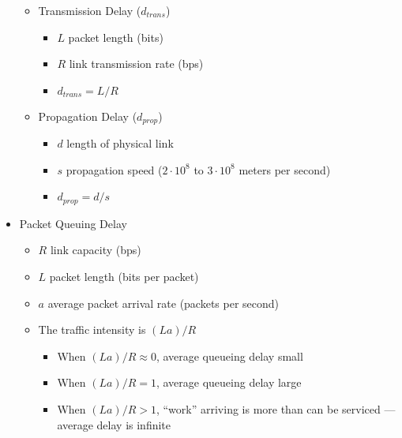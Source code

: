\begin{itemize}
\begin{itemize}
\begin{itemize}
        \end{itemize}

      \item Transmission Delay ($d_{trans}$)

        \begin{itemize}

          \item $L$ packet length (bits)

          \item $R$ link transmission rate (bps)

          \item $d_{trans}=L/R$

        \end{itemize}

      \item Propagation Delay ($d_{prop}$)

        \begin{itemize}

          \item $d$ length of physical link

          \item $s$ propagation speed ($2\cdot10^{8}$ to $3\cdot10^8$ meters per second)

          \item $d_{prop}=d/s$

        \end{itemize}

    \end{itemize}

    \item Packet Queuing Delay

    \begin{itemize}

      \item $R$ link capacity (bps)

      \item $L$ packet length (bits per packet)

      \item $a$ average packet arrival rate (packets per second)

      \item The traffic intensity is $(La)/R$

        \begin{itemize}

          \item When $(La)/R\approx 0$, average queueing delay small

          \item When $(La)/R=1$, average queueing delay large

          \item When $(La)/R>1$, ``work'' arriving is more than can be serviced — average delay is infinite

        \end{itemize}

    \end{itemize}

\end{itemize}



